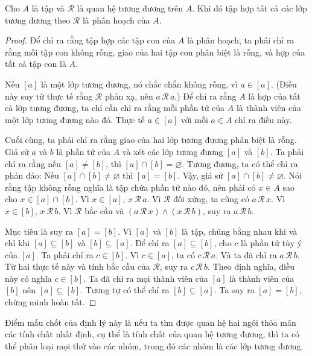 \begin{theorem}
Cho $A$ là tập và $\mathcal{R}$ là quan hệ tương đương trên $A$. Khi đó tập hợp tất cả các lớp tương đương theo $\mathcal{R}$ là phân hoạch của $A$.
\end{theorem}

\begin{proof}
Để chỉ ra rằng tập hợp các tập con của $A$ là phân hoạch, ta phải chỉ ra rằng mỗi tập con không rỗng, giao của hai tập con phân biệt là rỗng, và hợp của tất cả tập con là $A$.

Nếu $[a]$ là một lớp tương đương, nó chắc chắn không rỗng, vì $a \in [a]$. (Điều này suy từ thực tế rằng $\mathcal{R}$ phản xạ, nên $a\,\mathcal{R}\,a$.) Để chỉ ra rằng $A$ là hợp của tất cả lớp tương đương, ta chỉ cần chỉ ra rằng mỗi phần tử của $A$ là thành viên của một lớp tương đương nào đó. Thực tế $a \in [a]$ với mỗi $a \in A$ chỉ ra điều này.

Cuối cùng, ta phải chỉ ra rằng giao của hai lớp tương đương phân biệt là rỗng. Giả sử $a$ và $b$ là phần tử của $A$ và xét các lớp tương đương $[a]$ và $[b]$. Ta phải chỉ ra rằng nếu $[a] \neq [b]$, thì $[a] \cap [b] = \varnothing$. Tương đương, ta có thể chỉ ra phản đảo: Nếu $[a] \cap [b] \neq \varnothing$ thì $[a] = [b]$. Vậy, giả sử $[a] \cap [b] \neq \varnothing$. Nói rằng tập không rỗng nghĩa là tập chứa phần tử nào đó, nên phải có $x \in A$ sao cho $x \in [a] \cap [b]$. Vì $x \in [a]$, $x\,\mathcal{R}\,a$. Vì $\mathcal{R}$ đối xứng, ta cũng có $a\,\mathcal{R}\,x$. Vì $x \in [b]$, $x\,\mathcal{R}\,b$. Vì $\mathcal{R}$ bắc cầu và $(a\,\mathcal{R}\,x) \wedge (x\,\mathcal{R}\,b)$, suy ra $a\,\mathcal{R}\,b$.

Mục tiêu là suy ra $[a] = [b]$. Vì $[a]$ và $[b]$ là tập, chúng bằng nhau khi và chỉ khi $[a] \subseteq [b]$ và $[b] \subseteq [a]$. Để chỉ ra $[a] \subseteq [b]$, cho $c$ là phần tử tùy ý của $[a]$. Ta phải chỉ ra $c \in [b]$. Vì $c \in [a]$, ta có $c\,\mathcal{R}\,a$. Và ta đã chỉ ra $a\,\mathcal{R}\,b$. Từ hai thực tế này và tính bắc cầu của $\mathcal{R}$, suy ra $c\,\mathcal{R}\,b$. Theo định nghĩa, điều này có nghĩa $c \in [b]$. Ta đã chỉ ra mọi thành viên của $[a]$ là thành viên của $[b]$ nên $[a] \subseteq [b]$. Tương tự có thể chỉ ra $[b] \subseteq [a]$. Ta suy ra $[a] = [b]$, chứng minh hoàn tất.
\end{proof}

Điểm mấu chốt của định lý này là nếu ta tìm được quan hệ hai ngôi thỏa mãn các tính chất nhất định, cụ thể là tính chất của quan hệ tương đương, thì ta có thể phân loại mọi thứ vào các nhóm, trong đó các nhóm là các lớp tương đương.

